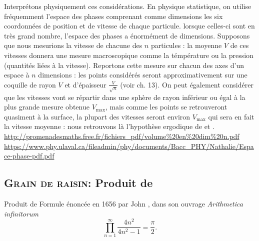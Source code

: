 \begin{remarque}
Interprétons physiquement ces considérations. En physique statistique, on utilise fréquemment l'espace des phases comprenant comme dimensions les six coordonnées de position et de vitesse de chaque particule. lorsque celles-ci sont en très grand nombre, l'espace des phases a énormément de dimensions. Supposons que nous mesurions la vitesse de chacune des $n$ particules : la moyenne $V$ de ces vitesses donnera une mesure macroscopique comme la témpérature ou la pression (quantités liées à la vitesse). Reportons cette mesure sur chacun des axes d'un espace à $n$ dimensions : les points considérés seront approximativement sur une coquille de rayon $V$ et d'épaisseur $\frac{V}{\sqrt{n}}$ (voir ch. 13). On peut également considérer que les vitesses vont se répartir dans une sphère de rayon inférieur ou égal à la plus grande mesure obtenue $V_\mathrm{max}$, mais comme les points se retrouveront quasiment à la surface, la plupart des vitesses seront environ $V_\mathrm{max}$ qui sera en fait la vitesse moyenne : nous retrouvons là l'hypothèse ergodique de  et . \url{http://promenadesmaths.free.fr/fichiers_pdf/volume%20en%20dim%20n.pdf} \url{https://www.phy.ulaval.ca/fileadmin/phy/documents/Bacc_PHY/Nathalie/Espace-phase-pdf.pdf}
\end{remarque}




\subsection{\textsc{Grain de raisin}: Produit de }


\begin{prop}{Produit de }
    Formule énoncée en 1656 par John , dans son ouvrage \emph{Arithmetica infinitorum}
    $$\prod_{n=1}^{\infty} \frac{4n^2}{4n^2-1} = \frac{\pi}{2}.$$
\end{prop}

